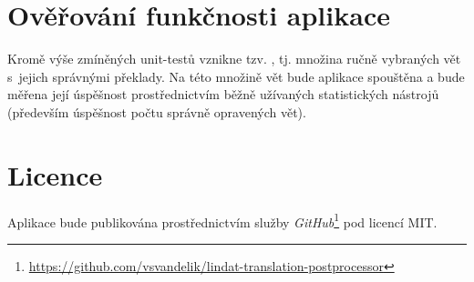 \documentclass[12pt,a4paper]{article}
\begin{document}
	\section{Ověřování funkčnosti aplikace}
	Kromě výše zmíněných unit-testů vznikne tzv. , tj. množina ručně vybraných vět s~jejich správnými překlady. Na této množině vět bude aplikace spouštěna a bude měřena její úspěšnost prostřednictvím běžně užívaných statistických nástrojů (především úspěšnost počtu správně opravených vět).
	
	\section{Licence}
	Aplikace bude publikována prostřednictvím služby \textit{GitHub}\footnote{\url{https://github.com/vsvandelik/lindat-translation-postprocessor}} pod licencí MIT.
	
\end{document}
